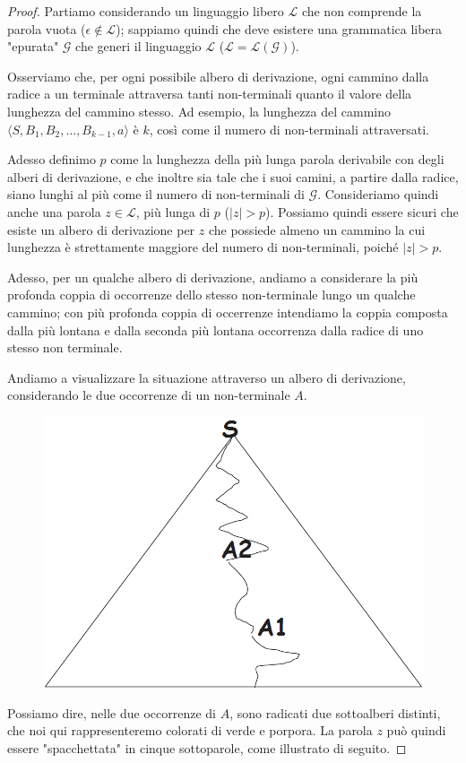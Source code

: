 \documentclass[class=book, crop=false, oneside, 12pt]{standalone}
\begin{document}
\begin{proof}
  Partiamo considerando un linguaggio libero \(\mathcal{L}\) che non comprende la parola vuota (\(\epsilon \notin \mathcal{L}\)); sappiamo quindi che deve esistere una grammatica libera "epurata" \(\mathcal{G}\) che generi il linguaggio \(\mathcal{L}\) (\(\mathcal{L} = \mathcal{L(G)}\)).

  Osserviamo che, per ogni possibile albero di derivazione, ogni cammino dalla radice a un terminale attraversa tanti non-terminali quanto il valore della lunghezza del cammino stesso. Ad esempio, la lunghezza del cammino \(\langle S, B_1, B_2, \ldots, B_{k-1}, a \rangle\) è \(k\), così come il numero di non-terminali attraversati.

  Adesso definimo \(p\) come la lunghezza della più lunga parola derivabile con degli alberi di derivazione, e che inoltre sia tale che i suoi camini, a partire dalla radice, siano lunghi al più come il numero di non-terminali di \(\mathcal{G}\). Consideriamo quindi anche una parola \(z \in \mathcal{L}\), più lunga di \(p\) (\(|z| > p\)). Possiamo quindi essere sicuri che esiste un albero di derivazione per \(z\) che possiede almeno un cammino la cui lunghezza è strettamente maggiore del numero di non-terminali, poiché \(|z| >p\).

  Adesso, per un qualche albero di derivazione, andiamo a considerare la più profonda coppia di occorrenze dello stesso non-terminale lungo un qualche cammino; con più profonda coppia di occerrenze intendiamo la coppia composta dalla più lontana e dalla seconda più lontana occorrenza dalla radice di uno stesso non terminale.

  Andiamo a visualizzare la situazione attraverso un albero di derivazione, considerando le due occorrenze di un non-terminale \(A\).

  \begin{figure}
    \centering
    \includegraphics[width=.25\textwidth,keepaspectratio]{pl-proof_1}
  \end{figure}

  Possiamo dire, nelle due occorrenze di \(A\), sono radicati due sottoalberi distinti, che noi qui rappresenteremo colorati di verde e porpora. La parola \(z\) può quindi essere "spacchettata" in cinque sottoparole, come illustrato di seguito.


\end{proof}
\end{document}
